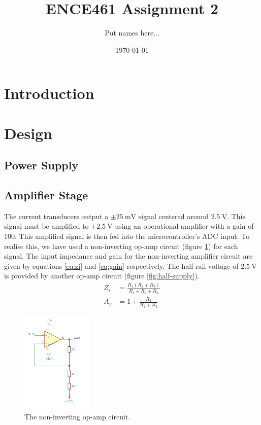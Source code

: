\documentclass[12pt]{article}
\title{ENCE461 Assignment 2}
\author{Put names here...}
\date{\today}
\begin{document}
\maketitle

\section{Introduction}





\section{Design}


\subsection{Power Supply}




\subsection{Amplifier Stage}

The current transducers output a $\pm \SI{25}{\milli\volt}$ signal centered around $\SI{2.5}{\volt}$.
This signal must be amplified to $\pm \SI{2.5}{\volt}$ using an operational amplifier with a gain of 100.
This amplified signal is then fed into the microcontroller's ADC input.
To realise this, we have used a non-inverting op-amp circuit (figure \ref{fig:non-inverting-op-amp}) for each signal.
The input impedance and gain for the non-inverting amplifier circuit are given by equations \ref{eq:zi} and \ref{eq:gain} respectively.
The half-rail voltage of $\SI{2.5}{\volt}$ is provided by another op-amp circuit (figure \ref{fig:half-supply}).
\begin{align}
	Z_i &= \frac{R_1 (R_2 + R_3)}{R_1 + R_2 + R_3} \label{eq:zi} \\
	A_v &= 1 + \frac{R_1}{R_2 + R_3}\label{eq:gain}
\end{align}

\begin{figure}[H]
	\centering
	\includegraphics[width=0.3\textwidth]{gain_circuit}
	\caption{The non-inverting op-amp circuit.}
	\label{fig:non-inverting-op-amp}
\end{figure}
\end{document}
